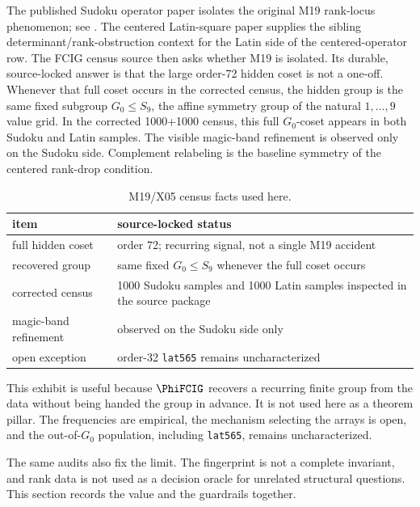 The published Sudoku operator paper isolates the original M19 rank-locus phenomenon; see \cite{BabanskyySudokuOperators2026}.  The centered Latin-square paper supplies the sibling determinant/rank-obstruction context for the Latin side of the centered-operator row\cite{BabanskyyLatin2026}.  The FCIG census source then asks whether M19 is isolated.  Its durable, source-locked answer is that the large order-72 hidden coset is not a one-off.  Whenever that full coset occurs in the corrected census, the hidden group is the same fixed subgroup \(G_0\leq S_9\), the affine symmetry group of the natural \(1,\ldots,9\) value grid.  In the corrected 1000+1000 census, this full \(G_0\)-coset appears in both Sudoku and Latin samples.  The visible magic-band refinement is observed only on the Sudoku side.  Complement relabeling is the baseline symmetry of the centered rank-drop condition.

\begin{table}[ht]
\centering
\caption{M19/X05 census facts used here.}
\label{tab:m19-census}
\begin{tabular}{@{}lL{0.62\textwidth}@{}}
\toprule
item & source-locked status \\
\midrule
full hidden coset & order 72; recurring signal, not a single M19 accident \\
recovered group & same fixed \(G_0\leq S_9\) whenever the full coset occurs \\
corrected census & 1000 Sudoku samples and 1000 Latin samples inspected in the source package \\
magic-band refinement & observed on the Sudoku side only \\
open exception & order-32 \texttt{lat565} remains uncharacterized \\
\bottomrule
\end{tabular}
\end{table}

This exhibit is useful because \(\PhiFCIG\) recovers a recurring finite group from the data without being handed the group in advance.  It is not used here as a theorem pillar.  The frequencies are empirical, the mechanism selecting the arrays is open, and the out-of-\(G_0\) population, including \texttt{lat565}, remains uncharacterized.

The same audits also fix the limit.  The fingerprint is not a complete invariant, and rank data is not used as a decision oracle for unrelated structural questions.  This section records the value and the guardrails together.